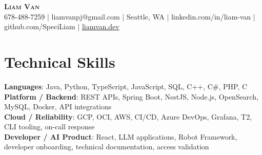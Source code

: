 \documentclass[letterpaper,11pt]{article}
\begin{document}

%
\begin{center}
    \textbf{\Huge \scshape Liam Van} \\ \vspace{1pt}
    \small 678-488-7259 $|$ \small {liamvanpj@gmail.com} $|$ Seattle, WA
 {{$|$ linkedin.com/in/liam-van} {$|$ github.com/SpeciLiam} {$|$ \href{https://liamvan.dev}{liamvan.dev}}}

\end{center}

\section{Technical Skills}
 \begin{itemize}[leftmargin=0.15in, label={}]
    \small{\item{
     \textbf{Languages}{: Java, Python, TypeScript, JavaScript, SQL, C++, C\#, PHP, C} \\
     \textbf{Platform / Backend}{: REST APIs, Spring Boot, NestJS, Node.js, OpenSearch, MySQL, Docker, API integrations} \\
     \textbf{Cloud / Reliability}{: GCP, OCI, AWS, CI/CD, Azure DevOps, Grafana, T2, CLI tooling, on-call response} \\
     \textbf{Developer / AI Product}{: React, LLM applications, Robot Framework, developer onboarding, technical documentation, access validation} \\
    }}
 \end{itemize}
%

\end{document}
